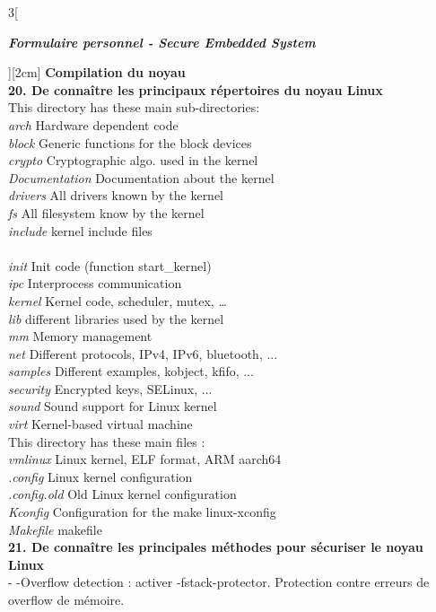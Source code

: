 \begin{multicols}{3}[\centerline{ \large\em \textbf{Formulaire personnel - Secure Embedded System}}][2cm]
{\Large \textbf{Compilation du noyau}}\\ 
\textbf{20. De connaître les principaux répertoires du noyau Linux\\}
This directory has these main sub-directories:\\
\textit{arch} Hardware dependent code\\
\textit{block} Generic functions for the block devices\\
\textit{crypto} Cryptographic algo. used in the kernel\\
\textit{Documentation} Documentation about the kernel\\
\textit{drivers} All drivers known by the kernel\\
\textit{fs} All filesystem know by the kernel\\
\textit{include} kernel include files\\\\
\textit{init} Init code (function start\_kernel)\\
\textit{ipc} Interprocess communication\\
\textit{kernel} Kernel code, scheduler, mutex, …\\
\textit{lib} different libraries used by the kernel\\
\textit{mm} Memory management\\
\textit{net} Different protocols, IPv4, IPv6, bluetooth, ...\\
\textit{samples} Different examples, kobject, kfifo, ...\\
\textit{security} Encrypted keys, SELinux, ...\\
\textit{sound} Sound support for Linux kernel\\
\textit{virt} Kernel-based virtual machine\\
This directory has these main files :\\
\textit{vmlinux} Linux kernel, ELF format, ARM aarch64\\
\textit{.config} Linux kernel configuration\\
\textit{.config.old} Old Linux kernel configuration\\
\textit{Kconfig} Configuration for the make linux-xconfig\\
\textit{Makefile} makefile
\\ \textbf{21. De connaître les principales méthodes pour sécuriser le noyau Linux\\}
- -Overflow detection : activer -fstack-protector. Protection contre erreurs de overflow de mémoire. \\

\end{multicols}
